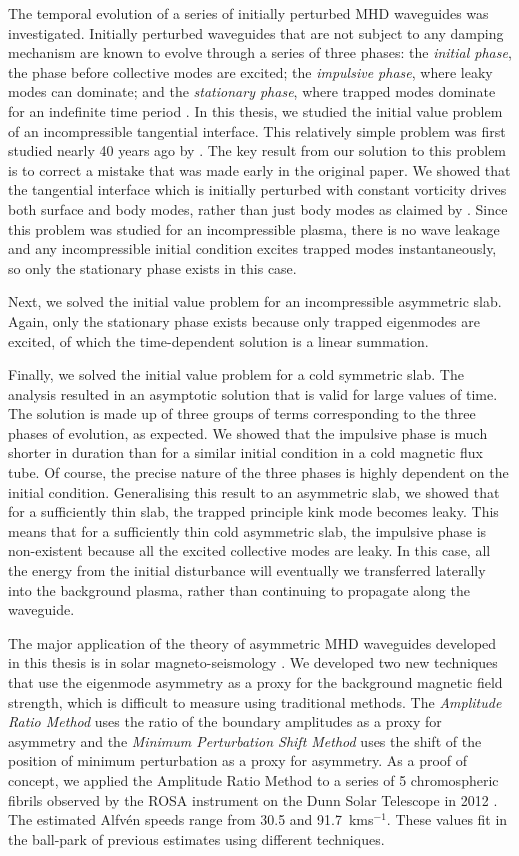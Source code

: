 The temporal evolution of a series of initially perturbed MHD waveguides was investigated. Initially perturbed waveguides that are not subject to any damping mechanism are known to evolve through a series of three phases: the \textit{initial phase}, the phase before collective modes are excited; the \textit{impulsive phase}, where leaky modes can dominate; and the \textit{stationary phase}, where trapped modes dominate for an indefinite time period \cite{rud_etal06b}. In this thesis, we studied the initial value problem of an incompressible tangential interface. This relatively simple problem was first studied nearly 40 years ago by \cite{rae_etal81}. The key result from our solution to this problem is to correct a mistake that was made early in the original paper. We showed that the tangential interface which is initially perturbed with constant vorticity drives both surface and body modes, rather than just body modes as claimed by \cite{rae_etal81}. Since this problem was studied for an incompressible plasma, there is no wave leakage and any incompressible initial condition excites trapped modes instantaneously, so only the stationary phase exists in this case.

Next, we solved the initial value problem for an incompressible asymmetric slab. Again, only the stationary phase exists because only trapped eigenmodes are excited, of which the time-dependent solution is a linear summation.

Finally, we solved the initial value problem for a cold symmetric slab. The analysis resulted in an asymptotic solution that is valid for large values of time. The solution is made up of three groups of terms corresponding to the three phases of evolution, as expected. We showed that the impulsive phase is much shorter in duration than for a similar initial condition in a cold magnetic flux tube. Of course, the precise nature of the three phases is highly dependent on the initial condition. Generalising this result to an asymmetric slab, we showed that for a sufficiently thin slab, the trapped principle kink mode becomes leaky. This means that for a sufficiently thin cold asymmetric slab, the impulsive phase is non-existent because all the excited collective modes are leaky. In this case, all the energy from the initial disturbance will eventually we transferred laterally into the background plasma, rather than continuing to propagate along the waveguide.

The major application of the theory of asymmetric MHD waveguides developed in this thesis is in solar magneto-seismology \citep{all_etal18a}. We developed two new techniques that use the eigenmode asymmetry as a proxy for the background magnetic field strength, which is difficult to measure using traditional methods. The \textit{Amplitude Ratio Method} uses the ratio of the boundary amplitudes as a proxy for asymmetry and the \textit{Minimum Perturbation Shift Method} uses the shift of the position of minimum perturbation as a proxy for asymmetry. As a proof of concept, we applied the Amplitude Ratio Method to a series of 5 chromospheric fibrils observed by the ROSA instrument on the Dunn Solar Telescope in 2012 \citep{all_etal19}. The estimated Alfv\'{e}n speeds range from 30.5 and 91.7~kms$^{-1}$. These values fit in the ball-park of previous estimates using different techniques.